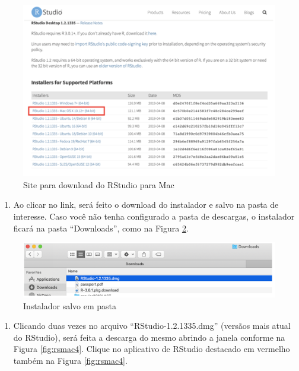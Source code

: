\documentclass[
]{book}
\providecommand{\tightlist}{%
  \setlength{\itemsep}{0pt}\setlength{\parskip}{0pt}}
\begin{document}
\begin{figure}
\includegraphics[width=1\linewidth]{figures/mac_RSt_1} \caption{\label{fig:rsmac2}Site para download do RStudio para Mac}\label{fig:rsmac2}
\end{figure}

\begin{enumerate}
\def\labelenumi{\arabic{enumi})}
\setcounter{enumi}{2}
\tightlist
\item
  Ao clicar no link, será feito o download do instalador e salvo na pasta de interesse. Caso você não tenha configurado a pasta de descargas, o instalador ficará na pasta ``Downloads'', como na Figura \ref{fig:rsmac3}.
\end{enumerate}

\begin{figure}
\includegraphics[width=1\linewidth]{figures/mac_RSt_2} \caption{\label{fig:rsmac3} Instalador salvo em pasta}\label{fig:rsmac3}
\end{figure}

\begin{enumerate}
\def\labelenumi{\arabic{enumi})}
\setcounter{enumi}{3}
\tightlist
\item
  Clicando duas vezes no arquivo ``RStudio-1.2.1335.dmg'' (versãos mais atual do RStudio), será feita a descarga do mesmo abrindo a janela conforme na Figura \ref{fig:rsmac4}. Clique no aplicativo de RStudio destacado em vermelho também na Figura \ref{fig:rsmac4}.
\end{enumerate}
\end{document}
